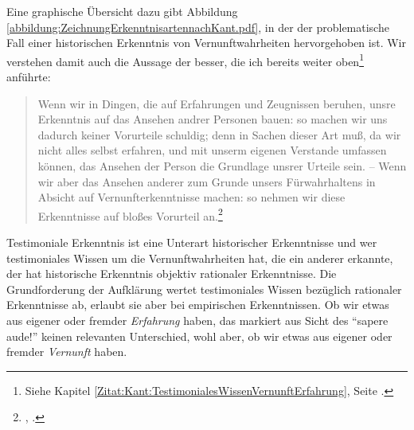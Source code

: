 Eine graphische Übersicht dazu gibt Abbildung
\ref{abbildung:ZeichnungErkenntnisartennachKant.pdf}, in der der problematische
Fall einer historischen Erkenntnis von Vernunftwahrheiten hervorgehoben ist.
Wir verstehen damit auch die Aussage der {\jaeschelogik} besser, die ich
bereits weiter oben\footnote{Siehe Kapitel
\ref{Zitat:Kant:TestimonialesWissenVernunftErfahrung}, Seite
\pageref{Zitat:Kant:TestimonialesWissenVernunftErfahrung}.} anführte:
\begin{quote}
 Wenn wir in Dingen, die auf Erfahrungen und Zeugnissen beruhen, unsre
Erkenntnis auf das Ansehen andrer Personen bauen: so machen wir uns dadurch
keiner Vorurteile schuldig; denn in Sachen dieser Art muß, da wir nicht alles
selbst erfahren, und mit unserm eigenen Verstande umfassen können, das Ansehen
der Person die Grundlage unsrer Urteile sein. -- Wenn wir aber das Ansehen
anderer zum Grunde unsers Fürwahrhaltens in Absicht auf Vernunfterkenntnisse
machen: so nehmen wir diese Erkenntnisse auf bloßes Vorurteil
an.\footnote{\cite[][A~120]{Kant:ImmanuelKantsLogik1977}, \cite[][IX:
77.31--78.5]{Kant:GesammelteWerke1900ff.}.}
\end{quote}
Testimoniale Erkenntnis ist eine Unterart historischer Erkenntnisse und wer
testimoniales Wissen um die Vernunftwahrheiten hat, die ein anderer erkannte,
der hat historische Erkenntnis objektiv rationaler Erkenntnisse. Die
Grundforderung der Aufklärung wertet testimoniales Wissen bezüglich
rationaler Erkenntnisse ab, erlaubt sie aber bei empirischen Erkenntnissen. Ob
wir etwas aus eigener oder fremder \emph{Erfahrung} haben, das markiert aus
Sicht des \enquote{sapere aude!} keinen relevanten Unterschied, wohl aber, ob
wir etwas aus eigener oder fremder \emph{Vernunft} haben.

